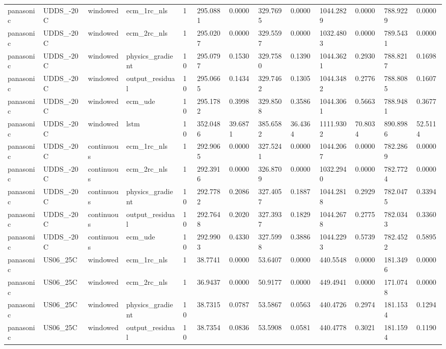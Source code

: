 \begin{tabular}{lllllllllllll}
panasonic & UDDS\_-20C & windowed & ecm\_1rc\_nls & 1 & 295.0881 & 0.0000 & 329.7695 & 0.0000 & 1044.2829 & 0.0000 & 788.9229 & 0.0000 \\
panasonic & UDDS\_-20C & windowed & ecm\_2rc\_nls & 1 & 295.0207 & 0.0000 & 329.5597 & 0.0000 & 1032.4803 & 0.0000 & 789.5431 & 0.0000 \\
panasonic & UDDS\_-20C & windowed & physics\_gradient & 10 & 295.0797 & 0.1530 & 329.7580 & 0.1390 & 1044.3621 & 0.2930 & 788.8217 & 0.1698 \\
panasonic & UDDS\_-20C & windowed & output\_residual & 10 & 295.0665 & 0.1434 & 329.7462 & 0.1305 & 1044.3482 & 0.2776 & 788.8085 & 0.1607 \\
panasonic & UDDS\_-20C & windowed & ecm\_ude & 10 & 295.1782 & 0.3998 & 329.8508 & 0.3586 & 1044.3061 & 0.5663 & 788.9481 & 0.3677 \\
panasonic & UDDS\_-20C & windowed & lstm & 10 & 352.0486 & 39.6871 & 385.6582 & 36.4364 & 1111.9302 & 70.8034 & 890.8986 & 52.5114 \\
panasonic & UDDS\_-20C & continuous & ecm\_1rc\_nls & 1 & 292.9065 & 0.0000 & 327.5241 & 0.0000 & 1044.2067 & 0.0000 & 782.2869 & 0.0000 \\
panasonic & UDDS\_-20C & continuous & ecm\_2rc\_nls & 1 & 292.3916 & 0.0000 & 326.8709 & 0.0000 & 1032.2940 & 0.0000 & 782.7724 & 0.0000 \\
panasonic & UDDS\_-20C & continuous & physics\_gradient & 10 & 292.7782 & 0.2086 & 327.4057 & 0.1887 & 1044.2818 & 0.2929 & 782.0475 & 0.3394 \\
panasonic & UDDS\_-20C & continuous & output\_residual & 10 & 292.7648 & 0.2020 & 327.3937 & 0.1829 & 1044.2678 & 0.2775 & 782.0343 & 0.3360 \\
panasonic & UDDS\_-20C & continuous & ecm\_ude & 10 & 292.9903 & 0.4330 & 327.5998 & 0.3886 & 1044.2293 & 0.5739 & 782.4522 & 0.5895 \\
panasonic & US06\_25C & windowed & ecm\_1rc\_nls & 1 & 38.7741 & 0.0000 & 53.6407 & 0.0000 & 440.5548 & 0.0000 & 181.3496 & 0.0000 \\
panasonic & US06\_25C & windowed & ecm\_2rc\_nls & 1 & 36.9437 & 0.0000 & 50.9177 & 0.0000 & 449.4941 & 0.0000 & 171.0748 & 0.0000 \\
panasonic & US06\_25C & windowed & physics\_gradient & 10 & 38.7315 & 0.0787 & 53.5867 & 0.0563 & 440.4726 & 0.2974 & 181.1534 & 0.1294 \\
panasonic & US06\_25C & windowed & output\_residual & 10 & 38.7354 & 0.0836 & 53.5908 & 0.0581 & 440.4778 & 0.3021 & 181.1594 & 0.1190 \\

\end{tabular}
